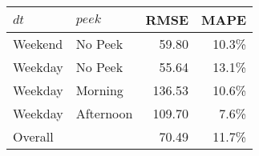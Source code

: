\begin{tabular}{llrr}
 $\mathit{dt}$ & $\mathit{peek}$ & RMSE & MAPE \\ 
  \hline
\hline
Weekend & No Peek & 59.80 & 10.3\% \\ 
   \hline
Weekday & No Peek & 55.64 & 13.1\% \\ 
   \hline
Weekday & Morning & 136.53 & 10.6\% \\ 
   \hline
Weekday & Afternoon & 109.70 & 7.6\% \\ 
   \hline
\hline
Overall &  & 70.49 & 11.7\% \\ 
  \end{tabular}
